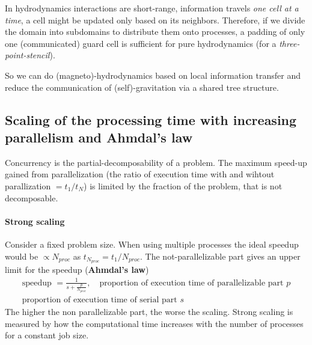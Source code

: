 In hydrodynamics interactions are short-range, information travels
\textit{one cell at a time}, a cell might be updated only based on
its neighbors. Therefore, if we divide the domain into subdomains to distribute
them onto processes, \textcolor{green1}{a padding of only one (communicated) guard cell is sufficient
for pure hydrodynamics} (for a \textit{three-point-stencil}).

So we can do (magneto)-hydrodynamics based on local information transfer and reduce the communication
of (self)-gravitation via a shared tree structure.

\subsection{Scaling of the processing time with increasing parallelism and Ahmdal's law}
Concurrency is the partial-decomposability of a problem. The maximum speed-up gained
from parallelization (the ratio of execution time with and wihtout parallization $= t_1 \slash t_N$)
is limited by the fraction of the problem, that is not decomposable.

\paragraph*{Strong scaling} Consider a fixed problem size. When using multiple processes
the ideal speedup would be $\propto N_{proc}$ as $t_{N_{proc}} = t_{1} \slash N_{proc}$. The not-parallelizable
part gives an upper limit for the speedup (\textbf{Ahmdal's law})
\begin{equation}
    \begin{gathered}
        \text{speedup } = \frac{1}{s + \frac{p}{N_{proc}}}, \quad \text{proportion of execution time of parallelizable part } p \\
        \text{proportion of execution time of serial part } s
    \end{gathered}
\end{equation}
The higher the non parallelizable part, the worse the scaling. 
Strong scaling is measured by how the
computational time increases with the number of processes for
a constant job size.

